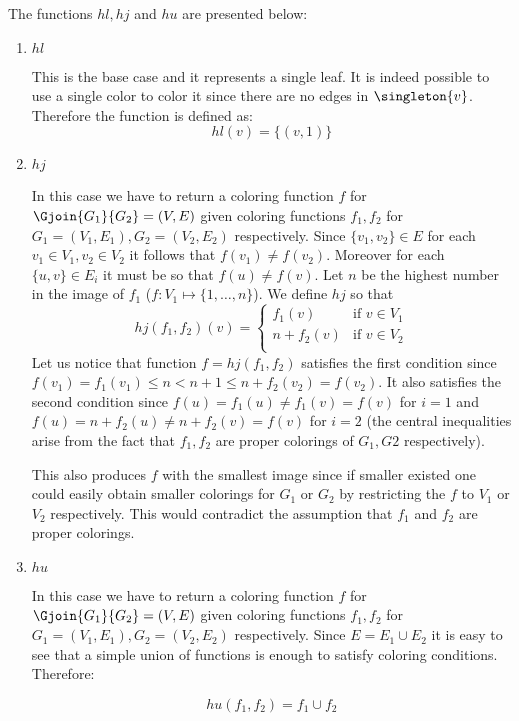 The functions $hl, hj$ and $hu$ are presented below:
\begin{enumerate}
    \item $hl$

          This is the base case and it represents a single leaf. It is indeed possible to use a single color to color it since there are no edges in $\singleton{v}$. Therefore the function is defined as:
          \[
              hl(v) = \{(v,1)\}
          \]

    \item $hj$

          In this case we have to return a coloring function $f$ for $\Gjoin{G_1}{G_2} = (V,E)$ given coloring functions $f_1,f_2$ for $G_1 = (V_1, E_1), G_2 = (V_2, E_2)$ respectively. Since $\{v_1, v_2\} \in E$ for each $v_1 \in V_1, v_2 \in V_2$ it follows that $f(v_1) \neq f(v_2)$. Moreover for each $\{u,v\} \in E_i$ it must be so that $f(u) \neq f(v)$. Let $n$ be the highest number in the image of $f_1$ ($f\colon V_1 \mapsto \{1, \ldots, n\}$). We define $hj$ so that
          \[
              hj(f_1, f_2)(v) = \begin{cases}
                  f_1(v)     & \text{if } v \in V_1 \\
                  n + f_2(v) & \text{if } v \in V_2 \\
              \end{cases}
          \]
          Let us notice that function $f = hj(f_1, f_2)$ satisfies the first condition since $f(v_1) = f_1(v_1) \leq n < n+1 \leq n + f_2(v_2) = f(v_2)$. It also satisfies the second condition since $f(u) = f_1(u) \neq f_1(v) = f(v)$ for $i = 1$ and $f(u) = n + f_2(u) \neq n + f_2(v) = f(v)$ for $i = 2$ (the central inequalities arise from the fact that $f_1, f_2$ are proper colorings of $G_1, G2$ respectively).

          This also produces $f$ with the smallest image since if smaller existed one could easily obtain smaller colorings for $G_1$ or $G_2$ by restricting the $f$ to $V_1$ or $V_2$ respectively. This would contradict the assumption that $f_1$ and $f_2$ are proper colorings.


    \item $hu$

          In this case we have to return a coloring function $f$ for $\Gjoin{G_1}{G_2} = (V,E)$ given coloring functions $f_1,f_2$ for $G_1 = (V_1, E_1), G_2 = (V_2, E_2)$ respectively. Since $E = E_1 \cup E_2$ it is easy to see that a simple union of functions is enough to satisfy coloring conditions. Therefore:

          \[
              hu(f_1, f_2) = f_1 \cup f_2
          \]
\end{enumerate}

